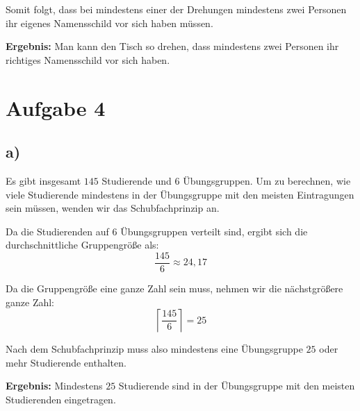 \documentclass[a4paper]{scrartcl}
\begin{document}
Somit folgt, dass bei mindestens einer der Drehungen mindestens zwei Personen ihr eigenes Namensschild vor sich haben müssen.

\textbf{Ergebnis:} Man kann den Tisch so drehen, dass mindestens zwei Personen ihr richtiges Namensschild vor sich haben.
\section*{Aufgabe 4}
\subsection*{a)}
Es gibt insgesamt \(145\) Studierende und \(6\) Übungsgruppen. Um zu berechnen, wie viele Studierende mindestens in der Übungsgruppe mit den meisten Eintragungen sein müssen, wenden wir das Schubfachprinzip an.

Da die Studierenden auf \(6\) Übungsgruppen verteilt sind, ergibt sich die durchschnittliche Gruppengröße als:
\[
\frac{145}{6} \approx 24{,}17
\]

Da die Gruppengröße eine ganze Zahl sein muss, nehmen wir die nächstgrößere ganze Zahl:
\[
\left\lceil \frac{145}{6} \right\rceil = 25
\]

Nach dem Schubfachprinzip muss also mindestens eine Übungsgruppe \(25\) oder mehr Studierende enthalten.

\textbf{Ergebnis:} Mindestens \(25\) Studierende sind in der Übungsgruppe mit den meisten Studierenden eingetragen.
\end{document}
